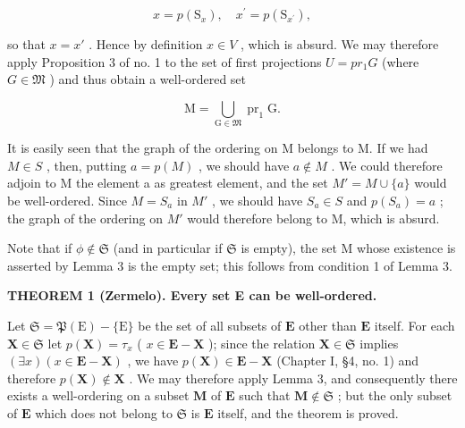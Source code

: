 \[
x = p \left(\mathrm{S} _ {x}\right), \quad x ^ {\prime} = p \left(\mathrm{S} _ {x ^ {\prime}}\right),
\]

so that \(x = x'\) . Hence by definition \(x \in V\) , which is absurd. We may therefore apply Proposition 3 of no. 1 to the set of first projections \(U = pr_1G\) (where \(G \in \mathfrak{M}\) ) and thus obtain a well-ordered set

\[
\mathrm{M} = \bigcup_ {\mathrm{G} \in \mathfrak {M}} \operatorname{pr} _ {1} \mathrm{G}.
\]

It is easily seen that the graph of the ordering on M belongs to M. If we had \(M \in S\) , then, putting \(a = p(M)\) , we should have \(a \notin M\) . We could therefore adjoin to M the element a as greatest element, and the set \(M' = M \cup \{a\}\) would be well-ordered. Since \(M = S_a\) in \(M'\) , we should have \(S_a \in S\) and \(p(S_a) = a\) ; the graph of the ordering on \(M'\) would therefore belong to M, which is absurd.

Note that if \(\phi \notin \mathfrak{S}\) (and in particular if \(\mathfrak{S}\) is empty), the set M whose existence is asserted by Lemma 3 is the empty set; this follows from condition 1 of Lemma 3.

\textbf{THEOREM 1 (Zermelo). Every set E can be well-ordered.}

Let \(\mathfrak{S} = \mathfrak{P}(\mathrm{E}) - \{\mathrm{E}\}\) be the set of all subsets of \(\mathbf{E}\) other than \(\mathbf{E}\) itself. For each \(\mathbf{X} \in \mathfrak{S}\) let \(p(\mathbf{X}) = \tau_x\) ( \(x \in \mathbf{E} - \mathbf{X}\) ); since the relation \(\mathbf{X} \in \mathfrak{S}\) implies \((\exists x)(x \in \mathbf{E} - \mathbf{X})\) , we have \(p(\mathbf{X}) \in \mathbf{E} - \mathbf{X}\) (Chapter I, §4, no. 1) and therefore \(p(\mathbf{X}) \notin \mathbf{X}\) . We may therefore apply Lemma 3, and consequently there exists a well-ordering on a subset \(\mathbf{M}\) of \(\mathbf{E}\) such that \(\mathbf{M} \notin \mathfrak{S}\) ; but the only subset of \(\mathbf{E}\) which does not belong to \(\mathfrak{S}\) is \(\mathbf{E}\) itself, and the theorem is proved.

